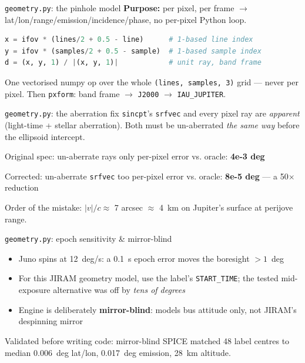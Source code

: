 \documentclass[aspectratio=169,11pt]{beamer}
\newcommand{\currevsec}{}
\newcommand{\revsec}[1]{\gdef\currevsec{#1}}
\begin{document}
\begin{frame}[fragile]{\texttt{geometry.py}: the pinhole model}
  \revsec{4.4}
  \textbf{Purpose:} per pixel, per frame $\to$ lat/lon/range/emission/incidence/phase, no per-pixel Python loop.
\begin{lstlisting}[language=Python]
x = ifov * (lines/2 + 0.5 - line)      # 1-based line index
y = ifov * (samples/2 + 0.5 - sample)  # 1-based sample index
d = (x, y, 1) / |(x, y, 1)|            # unit ray, band frame
\end{lstlisting}
  One vectorised numpy op over the whole \texttt{(lines, samples, 3)} grid --- never per pixel. Then \texttt{pxform}: band frame $\to$ \texttt{J2000} $\to$ \texttt{IAU\_JUPITER}.
\end{frame}

\begin{frame}{\texttt{geometry.py}: the aberration fix}
  \revsec{4.4}
  \texttt{sincpt}'s \texttt{srfvec} and every pixel ray are \emph{apparent} (light-time + stellar aberration). Both must be un-aberrated \emph{the same way} before the ellipsoid intercept.
  \vspace{0.2cm}
  \begin{block}{Original spec: un-aberrate rays only}
    per-pixel error vs. oracle: \textbf{4e-3 deg}
  \end{block}
  \begin{block}{Corrected: un-aberrate \texttt{srfvec} too}
    per-pixel error vs. oracle: \textbf{8e-5 deg} --- a 50$\times$ reduction
  \end{block}
  Order of the mistake: $|v|/c \approx$ 7 arcsec $\approx$ 4~km on Jupiter's surface at perijove range.
\end{frame}

\begin{frame}{\texttt{geometry.py}: epoch sensitivity \& mirror-blind}
  \revsec{4.4}
  \begin{itemize}
    \item Juno spins at 12~deg/s: a 0.1~s epoch error moves the boresight $>1$~deg
    \item For this JIRAM geometry model, use the label's \texttt{START\_TIME}; the tested mid-exposure alternative was off by \emph{tens of degrees}
    \item Engine is deliberately \textbf{mirror-blind}: models bus attitude only, not JIRAM's despinning mirror
  \end{itemize}
  \vspace{0.2cm}
  Validated before writing code: mirror-blind SPICE matched 48 label centres to median 0.006~deg lat/lon, 0.017~deg emission, 28~km altitude.
\end{frame}
\end{document}
